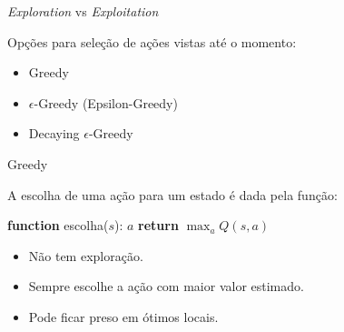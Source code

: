 \documentclass{beamer}
\begin{document}
\begin{frame}{\textit{Exploration} vs \textit{Exploitation}}

	Opções para seleção de ações vistas até o momento: 

	\begin{itemize}
		\item Greedy 
		\item $\epsilon$-Greedy (Epsilon-Greedy)
		\item Decaying $\epsilon$-Greedy
	\end{itemize}
\end{frame}


%		
%		
%		

\begin{frame}{Greedy}
	
	A escolha de uma ação para um estado é dada pela função:
	
	\vspace{0.3cm}
	
	\begin{algorithmic} 
		\STATE \textbf{function} escolha($s$): $a$
		\STATE \hspace*{\algorithmicindent} \textbf{return} $\max_{a}{Q(s, a)}$
	\end{algorithmic}
	
	\vspace{0.3cm}
	
	\begin{itemize}
		\item Não tem exploração. 
		\item Sempre escolhe a ação com maior valor estimado. 
		\item Pode ficar preso em ótimos locais. 
	\end{itemize}
	
\end{frame}
\end{document}
